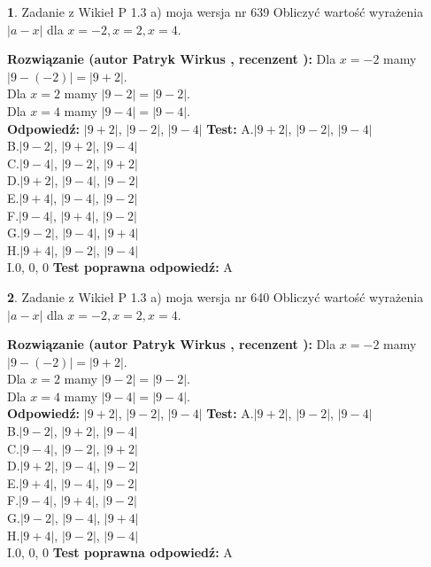 \documentclass[12pt, a4paper]{article}
\theoremstyle{definition} %
\newtheorem{zad}{}
\newcommand{\zadStart}[1]{\begin{zad}#1\newline}
\newcommand{\zadStop}{\end{zad}}
\newcommand{\rozwStart}[2]{\noindent \textbf{Rozwiązanie (autor #1 , recenzent #2): }\newline}
\newcommand{\rozwStop}{\newline}
\newcommand{\odpStart}{\noindent \textbf{Odpowiedź:}\newline}
\newcommand{\odpStop}{\newline}
\newcommand{\testStart}{\noindent \textbf{Test:}\newline}
\newcommand{\testStop}{\newline}
\newcommand{\kluczStart}{\noindent \textbf{Test poprawna odpowiedź:}\newline}
\newcommand{\kluczStop}{\newline}
\begin{document}
\zadStart{Zadanie z Wikieł P 1.3 a) moja wersja nr 639}
Obliczyć wartość wyrażenia $|a - x|$ dla $x=-2,x=2,x=4$.
\zadStop
\rozwStart{Patryk Wirkus}{}
Dla $x = -2$ mamy $|9 - (-2)| = |9 + 2|$.\\
Dla $x = 2$ mamy $|9 - 2| = |9 - 2|$.\\
Dla $x = 4$ mamy $|9 - 4| = |9 - 4|$.\\
\rozwStop
\odpStart
$|9 + 2|$, $|9 - 2|$, $|9 - 4|$
\odpStop
\testStart
A.$|9 + 2|$, $|9 - 2|$, $|9 - 4|$\\
B.$|9 - 2|$, $|9 + 2|$, $|9 - 4|$\\
C.$|9 - 4|$, $|9 - 2|$, $|9 + 2|$\\
D.$|9 + 2|$, $|9 - 4|$, $|9 - 2|$\\
E.$|9 + 4|$, $|9 - 4|$, $|9 - 2|$\\
F.$|9 - 4|$, $|9 + 4|$, $|9 - 2|$\\
G.$|9 - 2|$, $|9 - 4|$, $|9 + 4|$\\
H.$|9 + 4|$, $|9 - 2|$, $|9 - 4|$\\
I.$0$, $0$, $0$
\testStop
\kluczStart
A
\kluczStop



\zadStart{Zadanie z Wikieł P 1.3 a) moja wersja nr 640}
Obliczyć wartość wyrażenia $|a - x|$ dla $x=-2,x=2,x=4$.
\zadStop
\rozwStart{Patryk Wirkus}{}
Dla $x = -2$ mamy $|9 - (-2)| = |9 + 2|$.\\
Dla $x = 2$ mamy $|9 - 2| = |9 - 2|$.\\
Dla $x = 4$ mamy $|9 - 4| = |9 - 4|$.\\
\rozwStop
\odpStart
$|9 + 2|$, $|9 - 2|$, $|9 - 4|$
\odpStop
\testStart
A.$|9 + 2|$, $|9 - 2|$, $|9 - 4|$\\
B.$|9 - 2|$, $|9 + 2|$, $|9 - 4|$\\
C.$|9 - 4|$, $|9 - 2|$, $|9 + 2|$\\
D.$|9 + 2|$, $|9 - 4|$, $|9 - 2|$\\
E.$|9 + 4|$, $|9 - 4|$, $|9 - 2|$\\
F.$|9 - 4|$, $|9 + 4|$, $|9 - 2|$\\
G.$|9 - 2|$, $|9 - 4|$, $|9 + 4|$\\
H.$|9 + 4|$, $|9 - 2|$, $|9 - 4|$\\
I.$0$, $0$, $0$
\testStop
\kluczStart
A
\kluczStop
\end{document}
